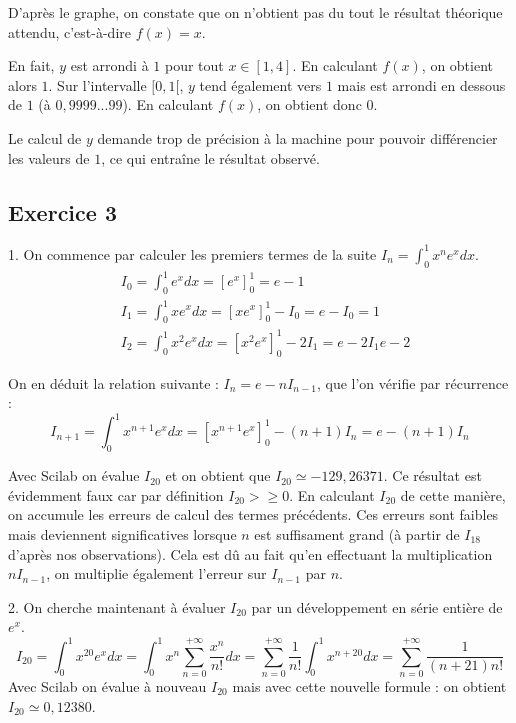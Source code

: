 \documentclass[a4paper,11pt]{article}
\begin{document}
	D'après le graphe, on constate que on n'obtient pas du tout le résultat théorique attendu, c'est-à-dire $f(x) = x$.
	
	En fait, $y$ est arrondi à $1$ pour tout $x \in [1, 4]$. En calculant $f(x)$, on obtient alors $1$. Sur l'intervalle $[0, 1[$, $y$ tend également vers $1$ mais est arrondi en dessous de $1$ (à $0,9999...99$). En calculant $f(x)$, on obtient donc $0$.
	
	Le calcul de $y$ demande trop de précision à la machine pour pouvoir différencier les valeurs de $1$, ce qui entraîne le résultat observé.


\subsection*{Exercice 3}
	1. On commence par calculer les premiers termes de la suite $I_{n} = \int_0^1 x^{n} e^{x} dx$.
	\begin{align*}
		& I_{0} = \int_0^1 e^{x} dx = [e^{x}]_0^1 = e - 1 \\
		& I_{1} = \int_0^1 x e^{x} dx = [x e^{x}]_0^1 - I_{0} = e - I_{0} = 1 \\
		& I_{2} = \int_0^1 x^{2} e^{x} dx = [x^{2} e^{x}]_0^1 - 2I_{1} = e - 2I_{1} e - 2
	\end{align*}

	On en déduit la relation suivante : $I_{n} = e - nI_{n-1}$, que l'on vérifie par récurrence :
	\begin{equation*}
		I_{n+1} = \int_0^1 x^{n+1} e^{x} dx = [x^{n+1} e^{x}]_0^1 - (n+1) I_{n} = e - (n+1)I_{n}
	\end{equation*}

	Avec Scilab on évalue $I_{20}$ et on obtient que  $I_{20} \simeq -129,26371$. Ce résultat est évidemment faux car par définition  $I_{20} >\geqslant 0$. En calculant $I_{20}$ de cette manière, on accumule les erreurs de calcul des termes précédents. Ces erreurs sont faibles mais deviennent significatives lorsque $n$ est suffisament grand (à partir de $I_{18}$ d'après nos observations). Cela est dû au fait qu'en effectuant la multiplication $nI_{n-1}$, on multiplie également l'erreur sur $I_{n-1}$ par $n$.

	2. On cherche maintenant à évaluer $I_{20}$ par un développement en série entière de $e^{x}$.
	\begin{equation*}
		I_{20} = \int_0^1 x^{20} e^{x} dx
		= \int_0^1 x^{n} \sum_{n=0}^{+\infty} \frac{x^{n}}{n!} dx
		= \sum_{n=0}^{+\infty} \frac{1}{n!} \int_0^1 x^{n+20} dx
		= \sum_{n=0}^{+\infty} \frac{1}{(n+21)n!}
	\end{equation*}
	Avec Scilab on évalue à nouveau $I_{20}$ mais avec cette nouvelle formule : on obtient $I_{20} \simeq 0,12380$.
	
\end{document}
